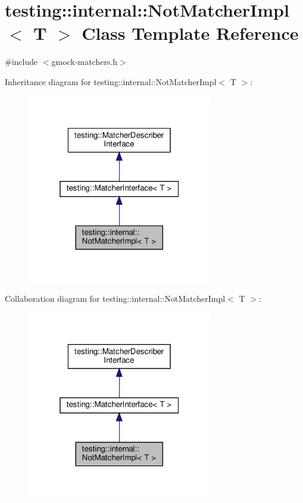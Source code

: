 \hypertarget{classtesting_1_1internal_1_1_not_matcher_impl}{}\section{testing\+:\+:internal\+:\+:Not\+Matcher\+Impl$<$ T $>$ Class Template Reference}
\label{classtesting_1_1internal_1_1_not_matcher_impl}


{\ttfamily \#include $<$gmock-\/matchers.\+h$>$}



Inheritance diagram for testing\+:\+:internal\+:\+:Not\+Matcher\+Impl$<$ T $>$\+:
\nopagebreak
\begin{figure}[H]
\begin{center}
\leavevmode
\includegraphics[width=229pt]{classtesting_1_1internal_1_1_not_matcher_impl__inherit__graph}
\end{center}
\end{figure}


Collaboration diagram for testing\+:\+:internal\+:\+:Not\+Matcher\+Impl$<$ T $>$\+:
\nopagebreak
\begin{figure}[H]
\begin{center}
\leavevmode
\includegraphics[width=229pt]{classtesting_1_1internal_1_1_not_matcher_impl__coll__graph}
\end{center}
\end{figure}
